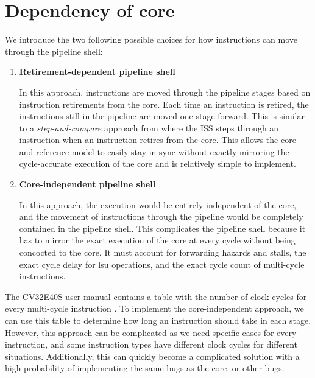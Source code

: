 \section{Dependency of core}
\label{sec:ps_dependency}

We introduce the two following possible choices for how instructions can move through the pipeline shell: 

\begin{enumerate}
    \item \textbf{Retirement-dependent pipeline shell}
    \par In this approach, instructions are moved through the pipeline stages based on instruction retirements from the core. Each time an instruction is retired, the instructions still in the pipeline are moved one stage forward. This is similar to a \textit{step-and-compare} approach from  where the ISS steps through an instruction when an instruction retires from the core. This allows the core and reference model to easily stay in sync without exactly mirroring the cycle-accurate execution of the core and is relatively simple to implement.

    \item \textbf{Core-independent pipeline shell}
    \par In this approach, the execution would be entirely independent of the core, and the movement of instructions through the pipeline would be completely contained in the pipeline shell. This complicates the pipeline shell because it has to mirror the exact execution of the core at every cycle without being concocted to the core. It must account for forwarding hazards and stalls, the exact cycle delay for \acrshort{lsu} operations, and the exact cycle count of multi-cycle instructions.
    



\end{enumerate}

The CV32E40S user manual contains a table with the number of clock cycles for every multi-cycle instruction \cite{openhwgroupPipelineDetailsCOREV2023}. To implement the core-independent approach, we can use this table to determine how long an instruction should take in each stage. However, this approach can be complicated as we need specific cases for every instruction, and some instruction types have different clock cycles for different situations. Additionally, this can quickly become a complicated solution with a high probability of implementing the same bugs as the core, or other bugs.

